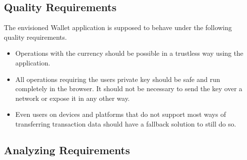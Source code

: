 \subsection{Quality Requirements}\label{qualityrequirements}
The envisioned Wallet application is supposed to behave under the following quality requirements. %
\begin{itemize}
\item Operations with the currency should be possible in a trustless way using the application.
\item All operations requiring the users private key should be safe and run completely in the browser. It should not be necessary to send the key over a network or expose it in any other way.
\item Even users on devices and platforms that do not support most ways of transferring transaction data should have a fallback solution to still do so.

\end{itemize}
\subsection{Analyzing Requirements}

